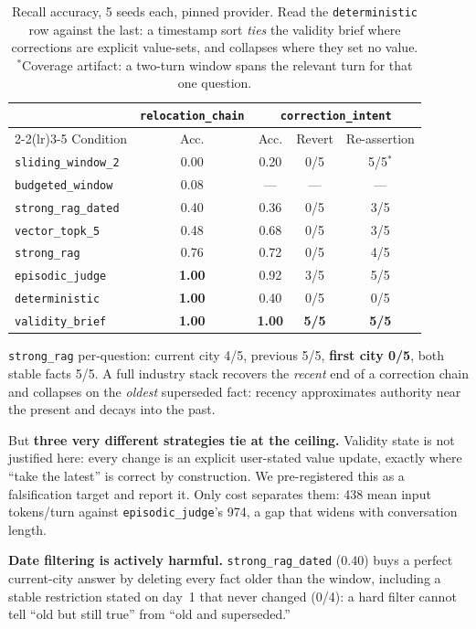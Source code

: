 \documentclass{article}
\begin{document}
\begin{table}[t]
\centering\footnotesize
\caption{Recall accuracy, 5 seeds each, pinned provider. Read the \texttt{deterministic} row against the last: a timestamp sort \emph{ties} the validity brief where corrections are explicit value-sets, and collapses where they set no value. $^{*}$Coverage artifact: a two-turn window spans the relevant turn for that one question.}
\label{tab:main}
\begin{tabular}{lcccc}
\toprule
& \multicolumn{1}{c}{\texttt{relocation\_chain}} & \multicolumn{3}{c}{\texttt{correction\_intent}} \\
\cmidrule(lr){2-2}\cmidrule(lr){3-5}
Condition & Acc. & Acc. & Revert & Re-assertion \\
\midrule
\texttt{sliding\_window\_2}  & 0.00 & 0.20 & 0/5 & 5/5$^{*}$ \\
\texttt{budgeted\_window}    & 0.08 & --- & --- & --- \\
\texttt{strong\_rag\_dated}  & 0.40 & 0.36 & 0/5 & 3/5 \\
\texttt{vector\_topk\_5}     & 0.48 & 0.68 & 0/5 & 3/5 \\
\texttt{strong\_rag}         & 0.76 & 0.72 & 0/5 & 4/5 \\
\texttt{episodic\_judge}     & \textbf{1.00} & 0.92 & 3/5 & 5/5 \\
\texttt{deterministic}       & \textbf{1.00} & 0.40 & 0/5 & 0/5 \\
\texttt{validity\_brief}  & \textbf{1.00} & \textbf{1.00} & \textbf{5/5} & \textbf{5/5} \\
\bottomrule
\end{tabular}
\end{table}

\texttt{strong\_rag} per-question: current city 4/5, previous 5/5, \textbf{first city 0/5}, both stable facts 5/5. A full industry stack recovers the \emph{recent} end of a correction chain and collapses on the \emph{oldest} superseded fact: recency approximates authority near the present and decays into the past.

But \textbf{three very different strategies tie at the ceiling.} Validity state is not justified here: every change is an explicit user-stated value update, exactly where ``take the latest'' is correct by construction. We pre-registered this as a falsification target and report it. Only cost separates them: 438 mean input tokens/turn against \texttt{episodic\_judge}'s 974, a gap that widens with conversation length.

\textbf{Date filtering is actively harmful.} \texttt{strong\_rag\_dated} (0.40) buys a perfect current-city answer by deleting every fact older than the window, including a stable restriction stated on day~1 that never changed (0/4): a hard filter cannot tell ``old but still true'' from ``old and superseded.''
\end{document}

